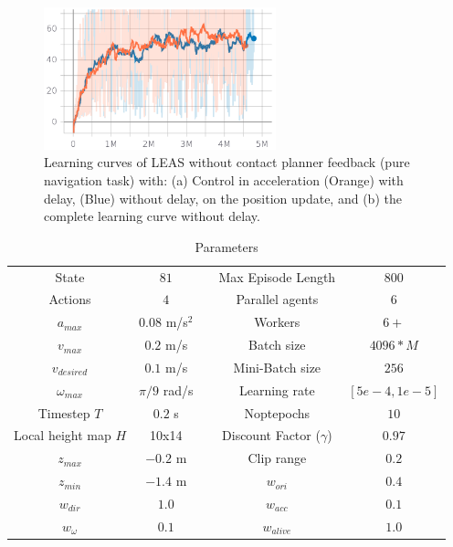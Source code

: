 \begin{figure}
    \centering
    \includegraphics[width=0.6\textwidth]{Figures/Chapter_LEAS/learning_curves_P1.png}
    \caption{Learning curves of LEAS without contact planner feedback (pure navigation task) with: (a) Control in acceleration (Orange) with delay, (Blue) without delay, on the position update, and (b) the complete learning curve without delay.}
    \label{fig:control_LEAS_learning_curves}
\end{figure}

\begin{table}[tb]
\begin{center}
\caption{Parameters}
\begin{tabular}{|c|c| c |c|c|}
 State & $81$ && Max Episode Length & $800$\\
 Actions & $4$ && Parallel agents & $6$\\
 $a_{max}$ & $0.08$ m/s$^2$ && Workers & $6+$\\
 $v_{max}$ & $0.2$ m/s && Batch size & $4096*M$\\
 $v_{desired}$ & $0.1$ m/s && Mini-Batch size & $256$\\
 $\omega_{max}$ & $\pi/9$ rad/s && Learning rate & $[5e-4,1e-5]$\\
 Timestep $T$ & $0.2$ s && Noptepochs & $10$\\
 Local height map $H$ & 10x14 && Discount Factor ($\gamma$) & $0.97$\\
 $z_{max}$ & $-0.2$ m  && Clip range & $0.2$\\
 $z_{min}$ & $-1.4$ m &&
 $w_{ori}$ & $0.4$ \\
 $w_{dir}$ & $1.0$  &&
 $w_{acc}$ & $0.1$ \\
 $w_{\omega}$ & $0.1$  &&
 $w_{alive}$ & $1.0$
\end{tabular}
\label{tab:param}
\end{center}
\end{table}

